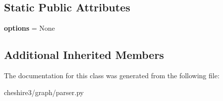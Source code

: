 \subsection*{Static Public Attributes}
\begin{DoxyCompactItemize}
\item 
\hypertarget{classcheshire3_1_1graph_1_1parser_1_1_rdfa_parser_a9510bcd0fee7ad79f23df66314ae7cb1}{{\bfseries options} = None}\label{classcheshire3_1_1graph_1_1parser_1_1_rdfa_parser_a9510bcd0fee7ad79f23df66314ae7cb1}

\end{DoxyCompactItemize}
\subsection*{Additional Inherited Members}


The documentation for this class was generated from the following file\-:\begin{DoxyCompactItemize}
\item 
cheshire3/graph/parser.\-py\end{DoxyCompactItemize}
